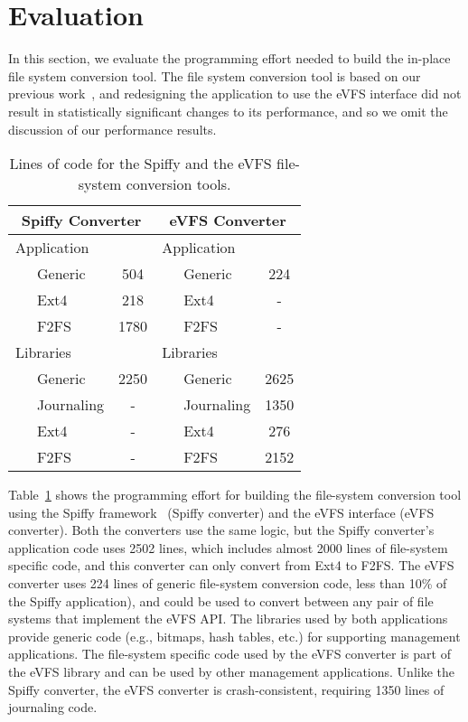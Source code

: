 \vspace{-0.75em}
\section{Evaluation\label{sec:Evaluation}}

In this section, we evaluate the programming effort needed to build the in-place file system conversion tool. The file system conversion tool is based on our previous work~\cite{sun2018spiffy}, and redesigning the application to use the eVFS interface did not result in statistically significant changes to its performance, and so we omit the discussion of our performance results.


\begin{table}
\begin{centering}

\begin{tabular}{|llc|llc|}
\hline 
\multicolumn{3}{|c|}{\textbf{Spiffy Converter}} & \multicolumn{3}{c|}{\textbf{eVFS Converter}}\tabularnewline
\hline 
\multicolumn{3}{|l|}{Application} & \multicolumn{3}{l|}{Application}\tabularnewline
~ & Generic & 504 & ~ & Generic & 224\tabularnewline
 & Ext4 & 218 &  & Ext4 & -\tabularnewline
 & F2FS & 1780 &  & F2FS & -\tabularnewline
\hline 
\multicolumn{3}{|l|}{Libraries} & \multicolumn{3}{l|}{Libraries}\tabularnewline
 & Generic & 2250 &  & Generic & 2625\tabularnewline
 & Journaling & - &  & Journaling & 1350\tabularnewline
 & Ext4 & - &  & Ext4 & 276\tabularnewline
 & F2FS & - &  & F2FS & 2152\tabularnewline
\hline 
\end{tabular}

\par\end{centering}
\vspace{-5pt}
\caption{\label{tab:programming-effort}Lines of code for the Spiffy and the eVFS file-system conversion tools.}
\vspace{-5pt}
\end{table}

Table~\ref{tab:programming-effort} shows the programming effort for building the file-system conversion tool using the Spiffy framework~\cite{sun2018spiffy} (Spiffy converter) and the eVFS interface (eVFS converter). Both the converters use the same logic, but the Spiffy converter's application code uses 2502 lines, which includes almost 2000 lines of file-system specific code, and this converter can only convert from Ext4 to F2FS. The eVFS converter uses 224 lines of generic file-system conversion code, less than 10\% of the Spiffy application), and could be used to convert between any pair of file systems that implement the eVFS API. The libraries used by both applications provide generic code (e.g., bitmaps, hash tables, etc.) for supporting management applications. The file-system specific code used by the eVFS converter is part of the eVFS library and can be used by other management applications. Unlike the Spiffy converter, the eVFS converter is crash-consistent, requiring 1350 lines of journaling code.
  
